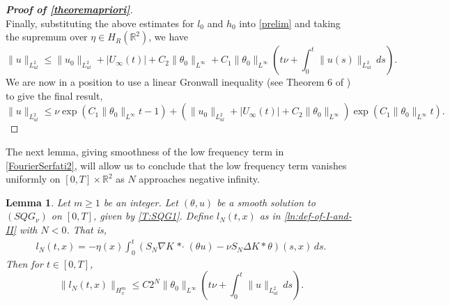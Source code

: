 \documentclass[11pt,reqno,xcolor=svgnames]{amsart}
\def\R{{\mathbb R}}
\theoremstyle{plain}
\newtheorem{lemma}[theorem]{Lemma}
\theoremstyle{definition}
\theoremstyle{plain}
\theoremstyle{remark}
\newcommand{\stardot}{{\mathop{* \cdot}}}
\begin{document}
\begin{proof}[\textbf{Proof of \cref{theoremapriori}}]
\begin{equation}
\end{equation}
Finally, substituting the above estimates for $l_0$ and $h_0$ into \cref{prelim} and taking the supremum over $\eta\in H_R(\R^2)$, we have
\begin{equation}
    \| u\|_{L^2_{ul}} \leq \|u_0\|_{L^2_{ul}} + |U_{\infty}(t)| +C_2\|\theta_0\|_{L^\infty} +  C_1\| \theta_0 \|_{L^{\infty}}\left(t\nu + \int_0^t \| u(s) \|_{L^2_{ul}}\, ds \right). 
\end{equation}
We are now in a position to use a linear Gronwall inequality (see Theorem 6 of \cite{dragomir2003some}) to give the final result,
\begin{equation}
    \|u\|_{L^2_{ul}} \leq \nu \exp(C_1\|\theta_0\|_{L^\infty}t -1) + \left(\| u_0\|_{L^2_{ul}} + |U_{\infty}(t)|+C_2\|\theta_0\|_{L^\infty} \right)\exp(C_1\|\theta_0\|_{L^\infty} t).
\end{equation}
\end{proof}
The next lemma, giving smoothness of the low frequency term in \cref{FourierSerfati2}, will allow us to conclude that the low frequency term vanishes uniformly on $[0,T]\times \R^2$ as $N$ approaches negative infinity. 
\begin{lemma}\label{IH12}
Let $m\geq 1$ be an integer.  Let $(\theta,u)$ be a smooth solution to $(SQG_{\nu})$ on $[0,T]$, given by \cref{T:SQG1}. Define $l_N(t,x)$ as in \cref{ln:def-of-I-and-II} with $N<0$. That is,
\begin{align*}
    l_N(t,x) =  -\eta(x)\int_0^t \left( S_{N}\nabla K \stardot (\theta u) - \nu S_{N}\Delta K \ast \theta\right)(s,x) \, ds.
\end{align*}
Then for $t\in[0,T]$,
\begin{equation}
\| l_N(t,x) \|_{H^m_x} \leq C2^{N}\| \theta_{0}\|_{L^{\infty}}\left(t\nu + \int_0^t \| u \|_{L^2_{ul}}\, ds\right).
\end{equation}
\end{lemma}
\end{document}
